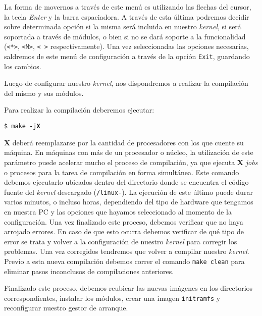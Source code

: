 \begin{questions}
  La forma de movernos a través de este menú es utilizando las flechas del
  cursor, la tecla \textit{Enter} y la barra espaciadora. A través de esta
  última podremos decidir sobre determinada opción si la misma será
  incluida en nuestro \textit{kernel}, si será soportada a través de módulos, o bien
  si no se dará soporte a la funcionalidad (\texttt{<*>}, \texttt{<M>},
  \texttt{< >} respectivamente). Una vez seleccionadas las opciones
  necesarias, saldremos de este menú de configuración a través de la opción
  \texttt{Exit}, guardando los cambios.

  \question Luego de configurar nuestro \textit{kernel}, nos dispondremos a realizar
  la compilación del mismo y sus módulos.
    
  Para realizar la compilación deberemos ejecutar:

  \texttt{\$ make -j\textbf{X}}

  \textbf{X} deberá reemplazarse por la cantidad de procesadores con los
  que cuente su máquina. En máquinas con más de un procesador o núcleo, la
  utilización de este parámetro puede acelerar mucho el proceso de
  compilación, ya que ejecuta \textbf{X} \textit{jobs} o procesos para la
  tarea de compilación en forma simultánea. Este comando debemos ejecutarlo
  ubicados dentro del directorio donde se encuentra el código fuente del
  \textit{kernel} descargado
  (\texttt{\KERNELSOURCEPATH/linux-\KERNELBASEVERSION}). La ejecución de
  este último puede durar varios minutos, o incluso horas, dependiendo del
  tipo de hardware que tengamos en nuestra PC y las opciones que hayamos
  seleccionado al momento de la configuración. Una vez finalizado este
  proceso, debemos verificar que no haya arrojado errores. En caso de que
  esto ocurra debemos verificar de qué tipo de error se trata y volver a la
  configuración de nuestro \textit{kernel} para corregir los problemas. Una
  vez corregidos tendremos que volver a compilar nuestro
  \textit{kernel}. Previo a esta nueva compilación debemos correr el
  comando \texttt{make clean} para eliminar pasos inconclusos de
  compilaciones anteriores.

  \question Finalizado este proceso, debemos reubicar las nuevas imágenes
  en los directorios correspondientes, instalar los módulos, crear una
  imagen \texttt{initramfs} y reconfigurar nuestro gestor de arranque.
\end{questions}
